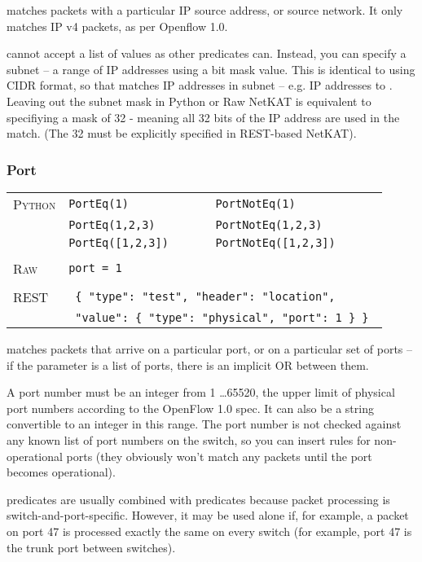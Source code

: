  matches packets with a particular IP source address, or source network.  It only matches
IP v4 packets, as per Openflow 1.0.  

 cannot accept a list of values as other predicates can.  
Instead, you can specify a subnet -- a range
of IP addresses using a bit mask value.  This is identical to using CIDR format, so that 
 matches IP addresses in subnet  -- e.g. 
IP addresses  to .  Leaving out the subnet mask in Python 
or Raw NetKAT is equivalent to specifiying a mask of 32 - meaning all 32 bits of the IP address are used
in the match.  (The 32 must be explicitly specified in REST-based NetKAT).


\subsubsection{Port}

\bigskip
\begin{tabularx}{\linewidth}{lXX}
\textsc{Python} 	& \texttt{PortEq(1)} 		& \texttt{PortNotEq(1)} \\
	 	& \texttt{PortEq(1,2,3)} 	& \texttt{PortNotEq(1,2,3)} \\
	 	& \texttt{PortEq([1,2,3])} 	& \texttt{PortNotEq([1,2,3])} \\ \\
\textsc{Raw}		& \texttt{port = 1} 		& \\ \\
\textsc{REST}	& \multicolumn{2}{l}{\texttt{ \{ "type": "test", "header": "location", }}\\
 & \multicolumn{2}{l}{\texttt{ "value": \{ "type": "physical", "port": 1 \} \} }} 
\end{tabularx}

 matches packets that arrive on a particular port, or on a particular set of ports -- if the 
parameter is a list of ports, there is an implicit OR between them.  

A port number must be an integer from
1 \ldots 65520, the upper limit of physical port numbers according to the OpenFlow 1.0 spec.  It can also be 
a string convertible to an integer in this range.  The port number is not checked against any known list
of port numbers on the switch, so you can insert rules for non-operational ports (they obviously won't
match any packets until the port becomes operational).  

 predicates are usually combined with  predicates because packet processing
is switch-and-port-specific.  However, it may be used alone if, for example, a packet on port 47 is processed exactly
the same on every switch (for example, port 47 is the trunk port between switches).  

